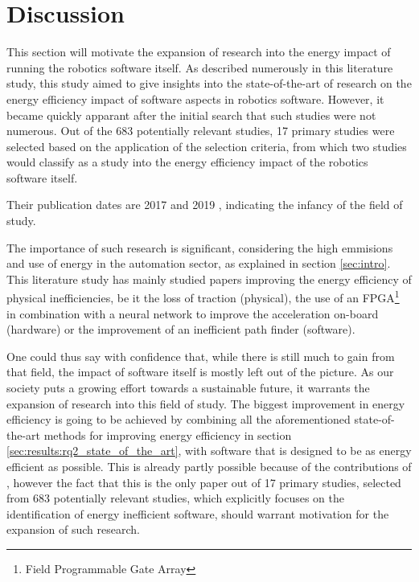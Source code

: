 \section{Discussion}
\label{sec:discussion}
This section will motivate the expansion of research into the energy impact of running the robotics software itself.
As described numerously in this literature study, this study aimed to give insights into the state-of-the-art of research
on the energy efficiency impact of software aspects in robotics software.
However, it became quickly apparant after the initial search that such studies were not numerous.
Out of the 683 potentially relevant studies, 17 primary studies were selected based on the application of the selection criteria, 
from which two studies would classify as a study into the energy efficiency impact of the robotics software itself.

Their publication dates are 2017 \cite{hou2017novel_cloud_evaluation_model} and 2019 \cite{rahman2019cloud_robot_offloading}, 
indicating the infancy of the field of study.

The importance of such research is significant, considering the high emmisions and use of energy in the automation sector, as explained
in section \ref{sec:intro}.
This literature study has mainly studied papers improving the energy efficiency of physical inefficiencies, 
be it the loss of traction (physical), the use of an FPGA\footnote{Field Programmable Gate Array} in combination with a neural network
to improve the acceleration on-board (hardware) or the improvement of an inefficient path finder (software).

One could thus say with confidence that, while there is still much to gain from that field, the impact of software itself is mostly left out
of the picture. 
As our society puts a growing effort towards a sustainable future, it warrants the expansion of research into this field of study.
The biggest improvement in energy efficiency is going to be achieved by combining all the aforementioned state-of-the-art methods for improving 
energy efficiency in section \ref{sec:results:rq2_state_of_the_art}, with software that is designed to be as energy efficient as possible.
This is already partly possible because of the contributions of \cite{hou2017novel_cloud_evaluation_model}, however the fact that this is the only paper
out of 17 primary studies, selected from 683 potentially relevant studies, which explicitly focuses on the identification of energy inefficient software, should warrant motivation for
the expansion of such research.
